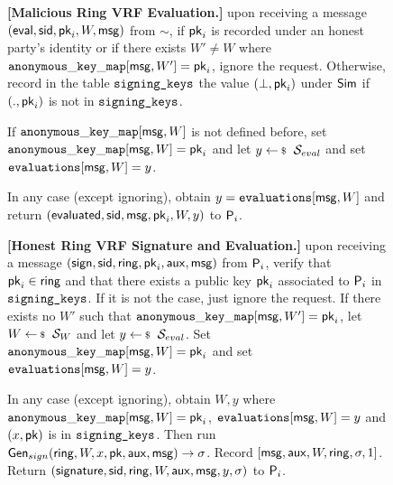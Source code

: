 \begin{figure}
\begin{tcolorbox}[left=2pt,right=2pt]
{			\textbf{[Malicious Ring VRF Evaluation.]}  upon receiving a message $(\mathsf{eval}, \textsf{sid}, \mathsf{pk}_i, W, \mathsf{msg})$ from $\sim$, if $ \mathsf{pk}_i $ is recorded under an honest party's identity or if there exists $ W'\neq W $ where $ \mathtt{anonymous\_key\_map}[\mathsf{msg},W'] = \mathsf{pk}_i $, ignore the request.
			Otherwise, record in the table $\texttt{signing\_keys}$ the value $(\perp,\mathsf{pk}_i)$ under $\mathsf{Sim}$ if $ (.,\mathsf{pk}_i) $ is not in $ \texttt{signing\_keys} $.
			
			If  $\mathtt{anonymous\_key\_map}[\mathsf{msg},W]  $ is not defined before, set $ \mathtt{anonymous\_key\_map}[\mathsf{msg},W] = \mathsf{pk}_i $ and let   $y \leftsample \setsym{S}_{eval}$ and set $ \texttt{evaluations}[\mathsf{msg}, W] = y$.
			
			In any case (except ignoring), obtain $ y = \texttt{evaluations}[\mathsf{msg}, W] $ and return $(\mathsf{evaluated}, \textsf{sid},  \mathsf{msg}, \mathsf{pk}_i,W, y)$ to $ \mathsf{P}_i $.
			
			\textbf{[Honest Ring VRF Signature and Evaluation.]} upon receiving a message $(\mathsf{sign}, \textsf{sid}, \mathsf{ring}, \mathsf{pk}_i,\mathsf{aux}, \mathsf{msg})$ from $\mathsf{P}_i$, verify that $\mathsf{pk}_i \in \mathsf{ring}$ and that there exists a public key $\mathsf{pk}_i$ associated to $\mathsf{P}_i$ in $ \texttt{signing\_keys} $. If it is not the case, just ignore the request. 	
			If there exists no $ W' $ such that $ \mathtt{anonymous\_key\_map}[\mathsf{msg},W'] =  \mathsf{pk}_i $, let $ W \leftsample \setsym{S}_W $ and let $y \leftsample \setsym{S}_{eval}$. Set $ \mathtt{anonymous\_key\_map}[\mathsf{msg},W] = \mathsf{pk}_i $ and set $ \texttt{evaluations}[\mathsf{msg}, W] = y$.
			
			In any case (except ignoring), obtain $ W, y $ where $ \mathtt{anonymous\_key\_map}[\mathsf{msg},W] =\mathsf{pk}_i $, $ \texttt{evaluations}[\mathsf{msg}, W] = y$ and  $ (x, \mathsf{pk}) $ is in $\texttt{signing\_keys} $. Then run  $ \mathsf{Gen}_{sign}(\mathsf{ring}, W,x,\mathsf{pk},\mathsf{aux},\mathsf{msg}) \rightarrow \sigma $.
			Record $ [\mathsf{msg},\mathsf{aux}, W, \mathsf{ring},\sigma, 1] $. Return $(\mathsf{signature}, \textsf{sid}, \mathsf{ring},W,\mathsf{aux},\mathsf{msg}, y, \sigma)$ to $\mathsf{P}_i$.
			
}
\end{tcolorbox}
\end{figure}
